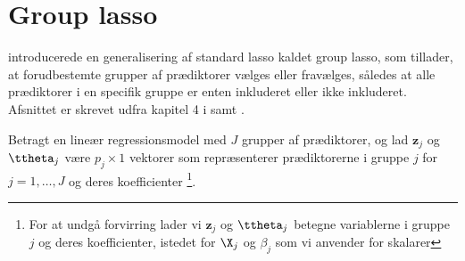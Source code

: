 \section{Group lasso}
\citep{group_lasso} introducerede en generalisering af standard lasso kaldet group lasso, som tillader, at forudbestemte grupper af prædiktorer vælges eller fravælges, således at alle prædiktorer i en specifik gruppe er enten inkluderet eller ikke inkluderet.
Afsnittet er skrevet udfra kapitel 4 i \citep{hastie} samt \citep{group_lasso}.

Betragt en lineær regressionsmodel med $J$ grupper af prædiktorer, og lad $\mathbf{z}_j$ og \(\ttheta_j\) være \(p_j \times 1\) vektorer som repræsenterer prædiktorerne i gruppe $j$ for $j=1, \ldots, J$ og deres koefficienter \footnote{For at undgå forvirring lader vi \(\mathbf{z}_j\) og \(\ttheta_j\) betegne variablerne i gruppe \(j\) og deres koefficienter, istedet for \(\X_j\) og \(\beta_j\) som vi anvender for skalarer}.

